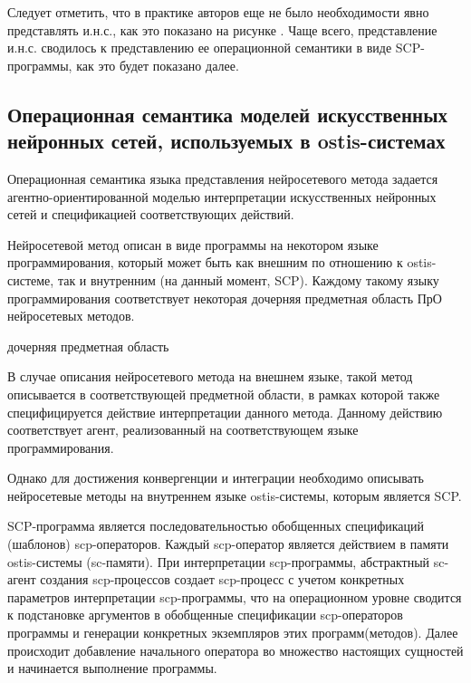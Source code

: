Следует отметить, что в практике авторов еще не было необходимости явно представлять и.н.с., как это показано на рисунке \textit{}. Чаще всего, представление и.н.с. сводилось к представлению ее операционной семантики в виде SCP-программы, как это будет показано далее.

\subsection{Операционная семантика моделей искусственных нейронных сетей, используемых в ostis-системах}

Операционная семантика языка представления нейросетевого метода задается агентно-ориентированной моделью интерпретации искусственных нейронных сетей и спецификацией соответствующих действий.

Нейросетевой метод описан в виде программы на некотором языке программирования, который может быть как внешним по отношению к ostis-системе, так и внутренним (на данный момент, SCP). Каждому такому языку программирования соответствует некоторая дочерняя предметная область ПрО нейросетевых методов.

\begin{SCn}
	\begin{scnrelfromset}{дочерняя предметная область}
	\end{scnrelfromset}
\end{SCn}

В случае описания нейросетевого метода на внешнем языке, такой метод описывается в соответствующей предметной области, в рамках которой также специфицируется действие интерпретации данного метода. Данному действию соответствует агент, реализованный на соответствующем языке программирования.

Однако для достижения конвергенции и интеграции необходимо описывать нейросетевые методы на внутреннем языке ostis-системы, которым является SCP.

SCP-программа является последовательностью обобщенных спецификаций (шаблонов) scp-операторов. Каждый scp-оператор является действием в памяти ostis-системы (sc-памяти). При интерпретации scp-программы, абстрактный sc-агент создания scp-процессов создает scp-процесс с учетом конкретных параметров интерпретации scp-программы, что на операционном уровне сводится к подстановке аргументов в обобщенные спецификации scp-операторов программы и генерации конкретных экземпляров этих программ(методов). Далее происходит добавление начального оператора во множество настоящих сущностей и начинается выполнение программы.

